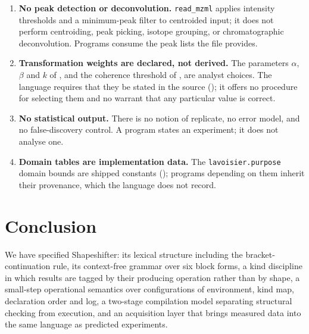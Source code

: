 \documentclass[11pt,twocolumn,a4paper]{article}
\theoremstyle{ssthm}
\theoremstyle{definition}
\theoremstyle{remark}
\newcommand{\shk}[1]{\texttt{#1}}
\begin{document}
\begin{enumerate}[label=\textbf{L\arabic*.},leftmargin=2.8em,itemsep=4pt]
\item \textbf{No peak detection or deconvolution.} \shk{read\_mzml}
      applies intensity thresholds and a minimum-peak filter to centroided
      input; it does not perform centroiding, peak picking, isotope
      grouping, or chromatographic deconvolution. Programs consume the
      peak lists the file provides.

\item \textbf{Transformation weights are declared, not derived.} The
      parameters $\alpha$, $\beta$ and $k$ of ,
      and the coherence threshold of , are analyst
      choices. The language requires that they be stated in the source
      (); it offers no procedure for selecting them and
      no warrant that any particular value is correct.

\item \textbf{No statistical output.} There is no notion of replicate,
      no error model, and no false-discovery control. A program states an
      experiment; it does not analyse one.

\item \textbf{Domain tables are implementation data.} The
      \shk{lavoisier.purpose} domain bounds are shipped constants
      (); programs depending on them inherit their
      provenance, which the language does not record.

\end{enumerate}

\section{Conclusion}
\label{sec:conclusion}

We have specified Shapeshifter: its lexical structure including the
bracket-continuation rule, its context-free grammar over six block
forms, a kind discipline in which results are tagged by their producing
operation rather than by shape, a small-step operational semantics over
configurations of environment, kind map, declaration order and log, a
two-stage compilation model separating structural checking from
execution, and an acquisition layer that brings measured data into the
same language as predicted experiments.
\end{document}
